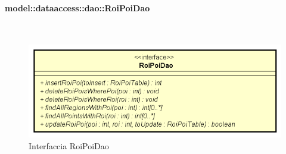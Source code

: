 \documentclass[../DefinizioneDiProdotto.tex]{subfiles}
\begin{document}
\paragraph{model::dataaccess::dao::RoiPoiDao}
\
\begin{figure}[H]
	\centering
	\includegraphics[width=\maxwidth]{img/RoiPoiDao.png}
	\caption{Interfaccia RoiPoiDao}\label{fig:model::dataaccess::dao::RoiPoiDao} 
\end{figure}
\end{document}
